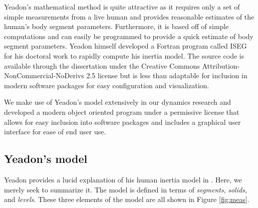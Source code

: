 \documentclass[10pt]{article}
\begin{document}
Yeadon's mathematical method is quite attractive as it requires only a set of
simple measurements from a live human and provides reasonable estimates of the
human's body segment parameters. Furthermore, it is based off of simple
computations and can easily be programmed to provide a quick estimate of body
segment parameters. Yeadon himself developed a Fortran program called ISEG for
his doctoral work \cite{Yeadon1984a} to rapidly compute his inertia model. The
source code is available through the dissertation under the Creative Commons
Attribution-NonCommercial-NoDerivs 2.5 license but is less than adaptable for
inclusion in modern software packages for easy configuration and visualization.

We make use of Yeadon's model extensively in our dynamics research and
developed a modern object oriented program under a permissive license that
allows for easy inclusion into software packages and includes a graphical user
interface for ease of end user use.

\subsection*{Yeadon's model}

Yeadon provides a lucid explanation of his human inertia model in
\cite{Yeadon1990c}. Here, we merely seek to summarize it. The model is defined
in terms of \emph{segments}, \emph{solids}, and \emph{levels}. These three
elements of the model are all shown in Figure \ref{fig:meas}.
\end{document}
